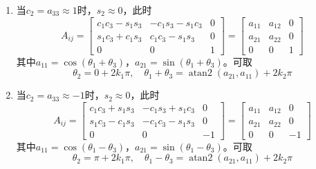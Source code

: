 \begin{enumerate}
\item[(I)] 当$c_2 = a_{33} \approx 1$时，$s_2 \approx 0$，此时
\begin{equation}
A_{ij} =
\begin{bmatrix}
c_1c_3 - s_1s_3 & -c_1s_3 - s_1c_3 & 0 \\[3pt]
s_1c_3 + c_1s_3 & c_1c_3 - s_1s_3  & 0 \\[3pt]
0               & 0                & 1
\end{bmatrix}
=
\begin{bmatrix}
a_{11} & a_{12} & 0 \\ a_{21} & a_{22} & 0 \\ 0 & 0 & 1
\end{bmatrix}
\end{equation}
其中$a_{11} = \cos(\theta_1 + \theta_3)$，$a_{21} = \sin(\theta_1 + \theta_3)$。可取
\begin{equation}
\theta_2 = 0 + 2k_1\pi, \quad
\theta_1 + \theta_3 = \operatorname{atan2}(a_{21}, a_{11}) + 2k_2\pi
\end{equation}

\item[(II)] 当$c_2 = a_{33} \approx -1$时，$s_2 \approx 0$，此时
\begin{equation}
A_{ij} =
\begin{bmatrix}
c_1c_3 + s_1s_3  & -c_1s_3 + s_1c_3 & 0  \\[3pt]
s_1c_3 - c_1s_3  & -c_1c_3 - s_1s_3 & 0  \\[3pt]
0                & 0                 & -1
\end{bmatrix}
=
\begin{bmatrix}
a_{11} & a_{12} & 0 \\ a_{21} & a_{22} & 0 \\ 0 & 0 & -1
\end{bmatrix}
\end{equation}
其中$a_{11} = \cos(\theta_1 - \theta_3)$，$a_{21} = \sin(\theta_1 - \theta_3)$。可取
\begin{equation}
\theta_2 = \pi + 2k_1\pi, \quad
\theta_1 - \theta_3 = \operatorname{atan2}(a_{21}, a_{11}) + 2k_2\pi
\end{equation}


\end{enumerate}
